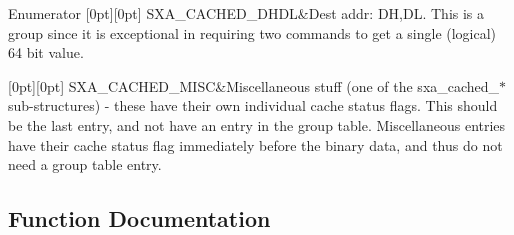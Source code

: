 \begin{DoxyEnumFields}{Enumerator}
[0pt][0pt]{}\mbox{\label{group___s_x_a_ggabed82baf7f470b522273a3e37c24c600a0ad9240e8ef31156d92883213e899924}} 
S\+X\+A\+\_\+\+C\+A\+C\+H\+E\+D\+\_\+\+D\+H\+DL&Dest addr\+: DH,DL. This is a group since it is exceptional in requiring two commands to get a single (logical) 64 bit value. \\
\hline

[0pt][0pt]{}\mbox{\label{group___s_x_a_ggabed82baf7f470b522273a3e37c24c600a8110f7d71f749b08814ced492ca2bd71}} 
S\+X\+A\+\_\+\+C\+A\+C\+H\+E\+D\+\_\+\+M\+I\+SC&Miscellaneous stuff (one of the sxa\+\_\+cached\+\_\+$\ast$ sub-\/structures) -\/ these have their own individual cache status flags. This should be the last entry, and not have an entry in the group table. Miscellaneous entries have their cache status flag immediately before the binary data, and thus do not need a group table entry. \\
\hline

\end{DoxyEnumFields}


\subsection{Function Documentation}
\mbox{\label{group___s_x_a_gaaa5cd9591d2c4735e4d9df944323ce17}} 
